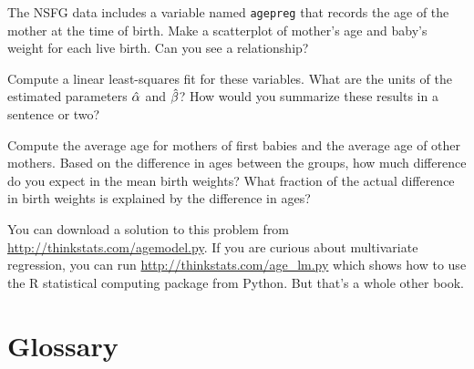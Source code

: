 \documentclass[12pt]{book}
\begin{document}
\begin{exercise}
The NSFG data includes a variable named {\tt agepreg} that records
the age of the mother at the time of birth.
Make a scatterplot of mother's age and baby's weight for each live
birth.  Can you see a relationship?

Compute a linear least-squares fit for these variables.  What are the
units of the estimated parameters $\hat{\alpha}$ and $\hat{\beta}$?
How would you summarize these results in a sentence or two?

Compute the average age for mothers of first babies and the average
age of other mothers.  Based on the difference in ages between the
groups, how much difference do you expect in the mean birth weights?
What fraction of the actual difference in birth weights is explained
by the difference in ages?

You can download a solution to this problem from
\url{http://thinkstats.com/agemodel.py}.  If you are curious about
multivariate regression, you can run \url{http://thinkstats.com/age_lm.py}
which shows how to use the R statistical computing package from
Python.  But that's a whole other book.

\end{exercise}


\section{Glossary}
\end{document}
